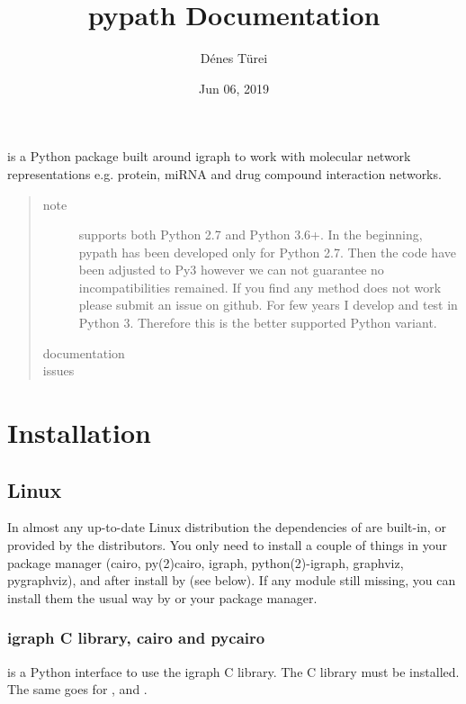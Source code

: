 \documentclass[letterpaper,10pt,english]{sphinxmanual}
\title{pypath Documentation}
\date{Jun 06, 2019}
\author{Dénes Türei}
\begin{document}
\pagestyle{empty}
\sphinxmaketitle
\pagestyle{plain}
\sphinxtableofcontents
\pagestyle{normal}
\label{\detokenize{index::doc}}


 is a Python package built around igraph to work with molecular
network representations e.g. protein, miRNA and drug compound interaction
networks.
\begin{quote}\begin{description}
\item[{note}] \leavevmode
{} supports both Python 2.7 and Python 3.6+. In the beginning,
pypath has been developed only for Python 2.7. Then the code have been
adjusted to Py3 however we can not guarantee no incompatibilities
remained. If you find any method does not work please submit an issue on
github. For few years I develop and test  in Python 3. Therefore
this is the better supported Python variant.

\item[{documentation}] \leavevmode
{}

\item[{issues}] \leavevmode
{}

\end{description}\end{quote}


\chapter{Installation}
\label{\detokenize{installation:installation}}\label{\detokenize{installation::doc}}

\section{Linux}
\label{\detokenize{installation:linux}}
In almost any up-to-date Linux distribution the dependencies of  are
built-in, or provided by the distributors. You only need to install a couple
of things in your package manager (cairo, py(2)cairo, igraph,
python(2)-igraph, graphviz, pygraphviz), and after install  by 
(see below). If any module still missing, you can install them the usual way
by  or your package manager.


\subsection{igraph C library, cairo and pycairo}
\label{\detokenize{installation:igraph-c-library-cairo-and-pycairo}}
 is a Python interface to use the igraph C library. The
C library must be installed. The same goes for ,  and
.
\end{document}
